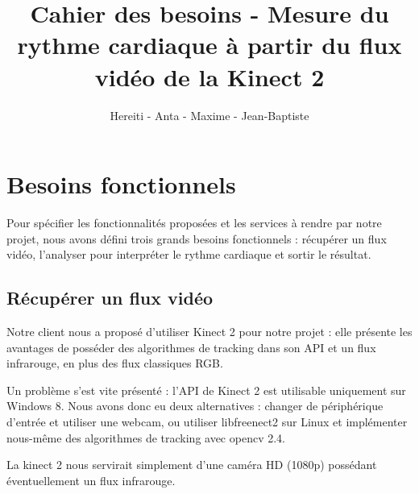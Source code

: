 \documentclass[12pt,a4paper]{article}
\title{Cahier des besoins - Mesure du rythme cardiaque à partir du flux vidéo de la Kinect 2}
\author{Hereiti \bsc{Hatitio} - Anta \bsc{Mbaye} - Maxime \bsc{Vincent} - Jean-Baptiste \bsc{Rey}}
\begin{document}
\maketitle

\section*{Besoins fonctionnels}
Pour spécifier les fonctionnalités proposées et les services à rendre par notre projet, nous avons défini trois grands besoins fonctionnels : récupérer un flux vidéo, l'analyser pour interpréter le rythme cardiaque et sortir le résultat.

\subsection*{Récupérer un flux vidéo}
Notre client nous a proposé d'utiliser Kinect 2 pour notre projet : elle présente les avantages de posséder des algorithmes de tracking dans son API et un flux infrarouge, en plus des flux classiques RGB.

Un problème s'est vite présenté : l'API de Kinect 2 est utilisable uniquement sur Windows 8. Nous avons donc eu deux alternatives : changer de périphérique d'entrée et utiliser une webcam, ou utiliser libfreenect2 sur Linux et implémenter nous-même des algorithmes de tracking avec opencv 2.4.

La kinect 2 nous servirait simplement d'une caméra HD (1080p) possédant éventuellement un flux infrarouge.
\end{document}
